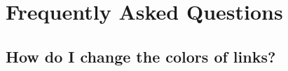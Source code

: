 
\chapter{Frequently Asked Questions} %

\label{AppendixA} %

\section{How do I change the colors of links?}

